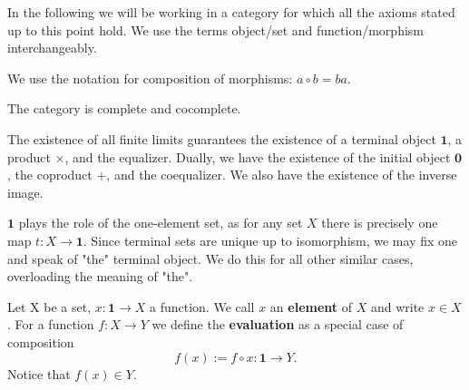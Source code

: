 \begin{remark}
In the following we will be working in a category for which all the axioms stated up to this point hold. We use the terms object/set and function/morphism interchangeably.

We use the notation for composition of morphisms: $a \circ b = ba$.
\end{remark}

\begin{axiom}[Completeness]
The category is complete and cocomplete.
\end{axiom}

\begin{remark}
The existence of all finite limits guarantees the existence of a terminal object $\mathbf{1}$, a product $\times$, and the equalizer. Dually, we have the existence of the initial object $\mathbf{0}$, the coproduct $+$, and the coequalizer. We also have the existence of the inverse image.
\end{remark}

\begin{remark}
$\mathbf{1}$ plays the role of the one-element set, as for any set $X$ there is precisely one map $t: X \longrightarrow \mathbf{1}$. Since terminal sets are unique up to isomorphism, we may fix one and speak of "the" terminal object. We do this for all other similar cases, overloading the meaning of "the".
\end{remark}

\begin{definition}
Let X be a set, $x: \mathbf{1} \longrightarrow X$ a function. We call $x$ an \textbf{element} of $X$ and write $x \in X$. For a function $f:X \longrightarrow Y$ we define the \textbf{evaluation} as a special case of composition 
\begin{equation*}
f(x) := f \circ x: \mathbf{1} \longrightarrow Y.
\end{equation*}
Notice that $f(x) \in Y$.
\end{definition}

